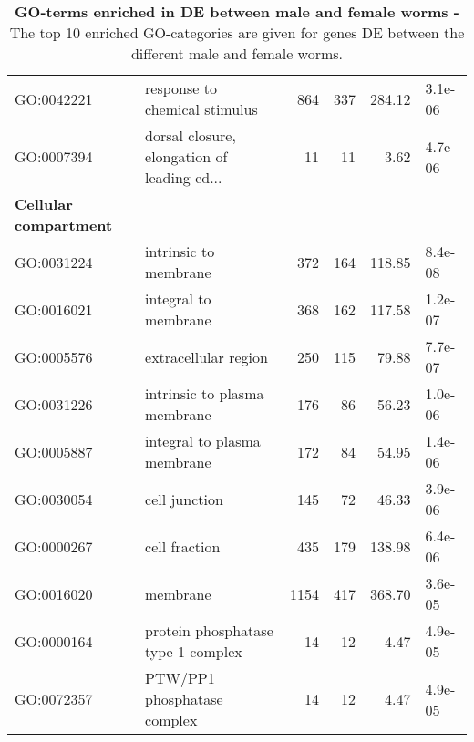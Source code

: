 \begin{table}[ht]
\begin{center}
\begin{tabular}{llrrrl}
  GO:0042221 & response to chemical stimulus & 864 & 337 & 284.12 & 3.1e-06 \\ 
  GO:0007394 & dorsal closure, elongation of leading ed... &  11 &  11 & 3.62 & 4.7e-06 \\ 
  \hline
  \textbf{Cellular compartment} &  &   &   &  &  \\ 
  GO:0031224 & intrinsic to membrane & 372 & 164 & 118.85 & 8.4e-08 \\ 
  GO:0016021 & integral to membrane & 368 & 162 & 117.58 & 1.2e-07 \\ 
  GO:0005576 & extracellular region & 250 & 115 & 79.88 & 7.7e-07 \\ 
  GO:0031226 & intrinsic to plasma membrane & 176 &  86 & 56.23 & 1.0e-06 \\ 
  GO:0005887 & integral to plasma membrane & 172 &  84 & 54.95 & 1.4e-06 \\ 
  GO:0030054 & cell junction & 145 &  72 & 46.33 & 3.9e-06 \\ 
  GO:0000267 & cell fraction & 435 & 179 & 138.98 & 6.4e-06 \\ 
  GO:0016020 & membrane & 1154 & 417 & 368.70 & 3.6e-05 \\ 
  GO:0000164 & protein phosphatase type 1 complex &  14 &  12 & 4.47 & 4.9e-05 \\ 
  GO:0072357 & PTW/PP1 phosphatase complex &  14 &  12 & 4.47 & 4.9e-05 \\ 
  \hline
\end{tabular}
\caption[GO-terms enriched in DE between male and
female]{\textbf{GO-terms enriched in DE between male and female worms
    -} The top 10 enriched GO-categories are given for genes DE
  between the different male and female worms.}
\end{center}
\end{table}


